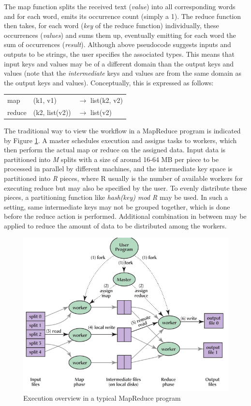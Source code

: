 The map function splits the received text (\textit{value}) into all corresponding words and for each word, emits its occurrence count (simply a 1). The reduce function then takes, for each word (\textit{key} of the reduce function) individually, these occurrences (\textit{values}) and sums them up, eventually emitting for each word the sum of occurrences (\textit{result}). Although above pseudocode suggests inputs and outputs to be strings, the user specifies the associated types. This means that input keys and values may be of a different domain than the output keys and values (note that the \textit{intermediate} keys and values are from the same domain as the output keys and values). Conceptually, this is expressed as follows:
\newline
\newline
\begin{tabular}{lll}
map	& (k1, v1) & $\to$ list(k2, v2)\\
reduce & (k2, list(v2)) & $\to$ list(v2)
\end{tabular}

The traditional way to view the workflow in a MapReduce program is indicated by Figure \ref{fig:mapreduce_workflow}. A master schedules execution and assigns tasks to workers, which then perform the actual map or reduce on the assigned data. Input data is partitioned into \textit{M} splits with a size of around 16-64 MB per piece to be processed in parallel by different machines, and the intermediate key space is partitioned into \textit{R} pieces, where R usually is the number of available workers for executing reduce but may also be specified by the user. To evenly distribute these pieces, a partitioning function like \textit{hash(key) mod R} may be used. In such a setting, same intermediate keys may not be grouped together, which is done before the reduce action is performed. Additional combination in between may be applied to reduce the amount of data to be distributed among the workers.

\begin{figure}
	\centering	
	\includegraphics{mapreduce_workflow}
	\caption{Execution overview in a typical MapReduce program}	
	\label{fig:mapreduce_workflow}
\end{figure} 
